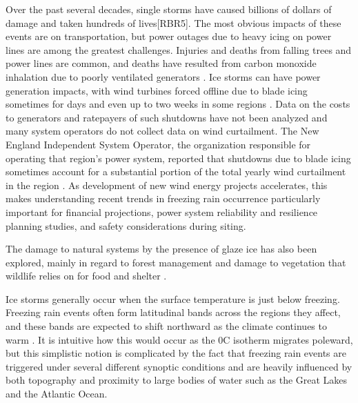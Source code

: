 \documentclass[twocol]{ametsoc}
\begin{document}
Over the past several decades, single storms have caused billions of dollars of damage and taken hundreds of lives[RBR5]. The most obvious impacts of these events are on transportation, but power outages due to heavy icing on power lines are among the greatest challenges. Injuries and deaths from falling trees and power lines are common, and deaths have resulted from carbon monoxide inhalation due to poorly ventilated generators \citep{daley2000outbreak}.  Ice storms can have power generation impacts, with wind turbines forced offline due to blade icing sometimes for days and even up to two weeks in some regions \citep{davis2014forecast}. Data on the costs to generators and ratepayers of such shutdowns have not been analyzed and many system operators do not collect data on wind curtailment. The New England Independent System Operator, the organization responsible for operating that region's power system, reported that shutdowns due to blade icing sometimes account for a substantial portion of the total yearly wind curtailment in the region \citep{bird2014wind}. As development of new wind energy projects accelerates, this makes understanding recent trends in freezing rain occurrence particularly important for financial projections, power system reliability and resilience planning studies, and safety considerations during siting. 



The damage to natural systems by the presence of glaze ice has also been explored, mainly in regard to forest management and damage to vegetation that wildlife relies on for food and shelter \citep{pellikka2000modelling}.






Ice storms generally occur when the surface temperature is just below freezing. Freezing rain events often form latitudinal bands across the regions they affect, and these bands are expected to shift northward as the climate continues to warm \citep{cheng2011possible,lambert2011simulated}. It is intuitive how this would occur as the 0\degree C isotherm migrates poleward, but this simplistic notion is complicated by the fact that freezing rain events are triggered under several different synoptic conditions and are heavily influenced by both topography and proximity to large bodies of water such as the Great Lakes and the Atlantic Ocean. 
\end{document}
